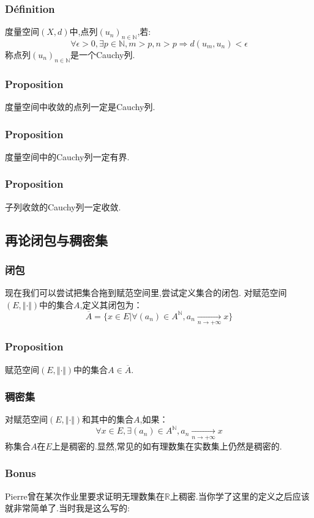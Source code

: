 \documentclass[12pt, a4paper, oneside]{ctexbook}
\newcommand{\R }{\mathbb{R}}%
\begin{document}
  \subsubsection{Définition}
  度量空间$(X,d)$中,点列$(u_n)_{n\in\mathbb{N}}$,若:
  $$
    \forall\epsilon>0, \exists p\in \mathbb{N}, m>p,n>p\Rightarrow d(u_m,u_n)<\epsilon
  $$
  称点列$(u_n)_{n\in\mathbb{N}}$是一个Cauchy列.
  \subsubsection{Proposition}
  度量空间中收敛的点列一定是Cauchy列.
  \subsubsection{Proposition}
  度量空间中的Cauchy列一定有界.
  \subsubsection{Proposition}
  子列收敛的Cauchy列一定收敛.


  \subsection{再论闭包与稠密集}
  \subsubsection{闭包}
  现在我们可以尝试把集合拖到赋范空间里,尝试定义集合的闭包.
  对赋范空间$(E,\Vert \cdot \Vert)$中的集合$A$,定义其闭包为：
  $$
    \overline{A}=\{x\in E | \forall(a_n)\in A^\mathbb{N},a_n\xrightarrow[n\rightarrow+\infty]{}x\}
  $$

  \subsubsection{Proposition}
  赋范空间$(E,\Vert \cdot \Vert)$中的集合$A\in\overline{A}$.
  \subsubsection{稠密集}
  对赋范空间$(E,\Vert \cdot \Vert)$和其中的集合$A$,如果：
  $$
    \forall x\in E, \exists (a_n)\in A^\mathbb{N}, a_n\xrightarrow[n\rightarrow+\infty]{}x
  $$
  称集合$A$在$E$上是稠密的.显然,常见的如有理数集在实数集上仍然是稠密的.
  \subsubsection{Bonus}
  Pierre曾在某次作业里要求证明无理数集在$\R$上稠密.当你学了这里的定义之后应该就非常简单了.当时我是这么写的:\\
\end{document}
